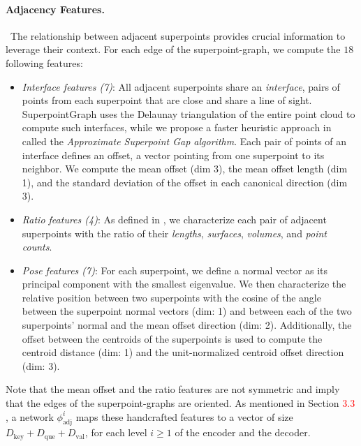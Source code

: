 \paragraph{Adjacency Features.}~The relationship between adjacent superpoints provides crucial information to leverage their context. For each edge of the superpoint-graph, we compute the $18$ following features: \\
\begin{itemize}
\item \textit{Interface features (7)}: 
All adjacent superpoints share an \emph{interface}, \ie pairs of points from each superpoint that are close and share a line of sight. SuperpointGraph \cite{landrieu2018large} uses the Delaunay triangulation of the entire point cloud to compute such interfaces, while we propose a faster heuristic approach in  called the \emph{Approximate Superpoint Gap algorithm}. Each pair of points of an interface defines an offset, \ie a vector pointing from one superpoint to its neighbor. We compute the mean offset (dim 3), the mean offset length (dim 1), and the standard deviation of the offset in each canonical direction (dim 3).

\item \textit{Ratio features (4)}: 
As defined in \cite{landrieu2018large}, we characterize each pair of adjacent superpoints with the ratio of their \textit{lengths}, \textit{surfaces}, \textit{volumes}, and \textit{point counts}.

\item \textit{Pose features (7)}: For each superpoint, we define a normal vector as its principal component with the smallest eigenvalue. We then characterize the relative position between two superpoints with the cosine of the angle between the superpoint normal vectors (dim: 1) and between each of the two superpoints' normal and the mean offset direction (dim: 2). Additionally, the offset between the centroids of the superpoints is used to compute the centroid distance (dim: 1) and the unit-normalized centroid offset direction (dim: 3).

\end{itemize}

Note that the mean offset and the ratio features are not symmetric and imply that the edges of the superpoint-graphs are oriented.
As mentioned in Section \textcolor{red}{$3.3$}, a network $\phi_\text{adj}^i$ maps these handcrafted features to a vector of size $D_\text{key}+D_\text{que}+D_\text{val}$, for each level $i\geq1$ of the encoder and the decoder.



